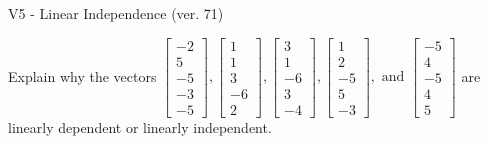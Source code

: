 \begin{exercise}
  \begin{exerciseTitle}V5 - Linear Independence (ver. 71)\end{exerciseTitle}
  \begin{exerciseStatement}
    Explain why the vectors \(\left[\begin{array}{r}
-2 \\
5 \\
-5 \\
-3 \\
-5
\end{array}\right] , \left[\begin{array}{r}
1 \\
1 \\
3 \\
-6 \\
2
\end{array}\right] , \left[\begin{array}{r}
3 \\
1 \\
-6 \\
3 \\
-4
\end{array}\right] , \left[\begin{array}{r}
1 \\
2 \\
-5 \\
5 \\
-3
\end{array}\right] , \text{ and } \left[\begin{array}{r}
-5 \\
4 \\
-5 \\
4 \\
5
\end{array}\right]\) are linearly dependent or linearly independent.	



\end{exerciseStatement}
\end{exercise}
